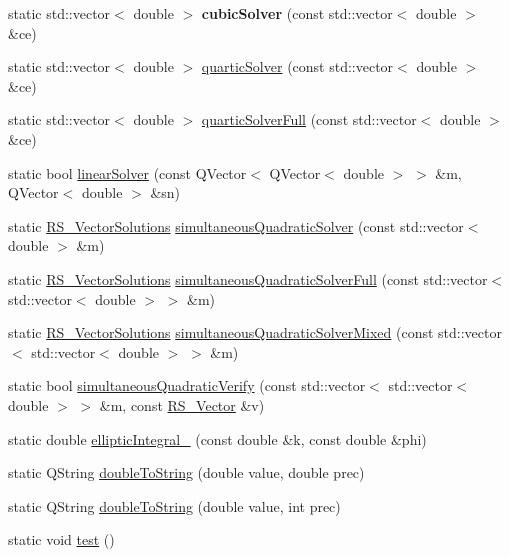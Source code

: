 \begin{DoxyCompactItemize}
\item 
\hypertarget{classRS__Math_a4e1161b5c368f6a23f5cf65c1a50a806}{static std\-::vector$<$ double $>$ {\bfseries cubic\-Solver} (const std\-::vector$<$ double $>$ \&ce)}\label{classRS__Math_a4e1161b5c368f6a23f5cf65c1a50a806}

\item 
static std\-::vector$<$ double $>$ \hyperlink{classRS__Math_af4f87bcf267d12eff9cae3123d0cc4cc}{quartic\-Solver} (const std\-::vector$<$ double $>$ \&ce)
\item 
static std\-::vector$<$ double $>$ \hyperlink{classRS__Math_aea615c3a57d93b4722870f34d8aee59e}{quartic\-Solver\-Full} (const std\-::vector$<$ double $>$ \&ce)
\item 
static bool \hyperlink{classRS__Math_a71a95e505cac0e56a9d9d03639270f73}{linear\-Solver} (const Q\-Vector$<$ Q\-Vector$<$ double $>$ $>$ \&m, Q\-Vector$<$ double $>$ \&sn)
\item 
static \hyperlink{classRS__VectorSolutions}{R\-S\-\_\-\-Vector\-Solutions} \hyperlink{classRS__Math_abf5a54549bf59de716b4afff3c64805c}{simultaneous\-Quadratic\-Solver} (const std\-::vector$<$ double $>$ \&m)
\item 
static \hyperlink{classRS__VectorSolutions}{R\-S\-\_\-\-Vector\-Solutions} \hyperlink{classRS__Math_a944ac480e7a6021f64ee1df480bff7e5}{simultaneous\-Quadratic\-Solver\-Full} (const std\-::vector$<$ std\-::vector$<$ double $>$ $>$ \&m)
\item 
static \hyperlink{classRS__VectorSolutions}{R\-S\-\_\-\-Vector\-Solutions} \hyperlink{classRS__Math_a99aa6798cc6c15e910ef3152ef6a76cb}{simultaneous\-Quadratic\-Solver\-Mixed} (const std\-::vector$<$ std\-::vector$<$ double $>$ $>$ \&m)
\item 
static bool \hyperlink{classRS__Math_a0ae306acd0f3edb84555e3c0a5d1a049}{simultaneous\-Quadratic\-Verify} (const std\-::vector$<$ std\-::vector$<$ double $>$ $>$ \&m, const \hyperlink{classRS__Vector}{R\-S\-\_\-\-Vector} \&v)
\item 
static double \hyperlink{classRS__Math_aaae44ec0328bfe0d2ad664eef03a0494}{elliptic\-Integral\-\_} (const double \&k, const double \&phi)
\item 
static Q\-String \hyperlink{classRS__Math_abe2a4ac0527cb9c7c7c79b89864e321e}{double\-To\-String} (double value, double prec)
\item 
static Q\-String \hyperlink{classRS__Math_ab5c03ef4a4aacd9bc6f2dc7a8d1542d8}{double\-To\-String} (double value, int prec)
\item 
static void \hyperlink{classRS__Math_ad19ab060a70905596d1a4ae35b68de56}{test} ()
\end{DoxyCompactItemize}


